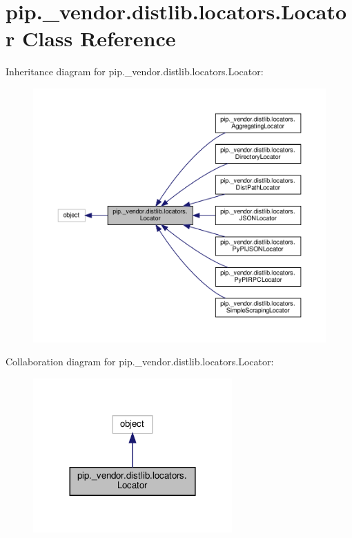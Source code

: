 \hypertarget{classpip_1_1__vendor_1_1distlib_1_1locators_1_1Locator}{}\section{pip.\+\_\+vendor.\+distlib.\+locators.\+Locator Class Reference}
\label{classpip_1_1__vendor_1_1distlib_1_1locators_1_1Locator}


Inheritance diagram for pip.\+\_\+vendor.\+distlib.\+locators.\+Locator\+:
\nopagebreak
\begin{figure}[H]
\begin{center}
\leavevmode
\includegraphics[width=350pt]{classpip_1_1__vendor_1_1distlib_1_1locators_1_1Locator__inherit__graph}
\end{center}
\end{figure}


Collaboration diagram for pip.\+\_\+vendor.\+distlib.\+locators.\+Locator\+:
\nopagebreak
\begin{figure}[H]
\begin{center}
\leavevmode
\includegraphics[width=216pt]{classpip_1_1__vendor_1_1distlib_1_1locators_1_1Locator__coll__graph}
\end{center}
\end{figure}
